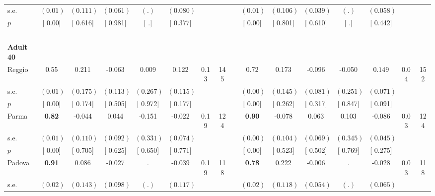 \begin{longtable}{L{8em} c c c c c c c p{1em} c c c c c c c}
\quad \quad \quad \quad s.e.& $ (     0.01)$ & $ (    0.111)$ & $ (    0.061)$ & $ (        .)$ & $ (    0.080)$ & & & & $ (     0.01)$ & $ (    0.106)$ & $ (    0.039)$ & $ (        .)$ & $ (    0.058)$ & &  \\*
\quad \quad \quad \quad $ p$ & [     0.00] & [    0.616] & [    0.981] & [        .] & [    0.377] & & & & [     0.00] & [    0.801] & [    0.610] & [        .] & [    0.442] & &  \\[1em]
~\\[1em]
\quad \quad \textbf{Adult 40} & & & & & & & & & & & & & & & \\* 
\quad \quad \quad Reggio& 0.55 &     0.211 &    -0.063 &     0.009 &     0.122 &      0.13 &       145 & & 0.72 &     0.173 &    -0.096 &    -0.050 & $ \mathbf{    0.149}$ &      0.04 &       152  \\*
\quad \quad \quad \quad s.e.& $ (     0.01)$ & $ (    0.175)$ & $ (    0.113)$ & $ (    0.267)$ & $ (    0.115)$ & & & & $ (     0.00)$ & $ (    0.145)$ & $ (    0.081)$ & $ (    0.251)$ & $ (    0.071)$ & &  \\*
\quad \quad \quad \quad $ p$ & [     0.00] & [    0.174] & [    0.505] & [    0.972] & [    0.177] & & & & [     0.00] & [    0.262] & [    0.317] & [    0.847] & [    0.091] & &  \\[1em]
\quad \quad \quad Parma& \textbf{     0.82} &    -0.044 &     0.044 &    -0.151 &    -0.022 &      0.19 &       124 & & \textbf{     0.90} &    -0.078 &     0.063 &     0.103 &    -0.086 &      0.03 &       124  \\*
\quad \quad \quad \quad s.e.& $ (     0.01)$ & $ (    0.110)$ & $ (    0.092)$ & $ (    0.331)$ & $ (    0.074)$ & & & & $ (     0.00)$ & $ (    0.104)$ & $ (    0.069)$ & $ (    0.345)$ & $ (    0.045)$ & &  \\*
\quad \quad \quad \quad $ p$ & [     0.00] & [    0.705] & [    0.625] & [    0.650] & [    0.771] & & & & [     0.00] & [    0.523] & [    0.502] & [    0.769] & [    0.275] & &  \\[1em]
\quad \quad \quad Padova& \textbf{     0.91} &     0.086 &    -0.027 &         . &    -0.039 &      0.19 &       118 & & \textbf{     0.78} &     0.222 &    -0.006 &         . &    -0.028 &      0.03 &       118  \\*
\quad \quad \quad \quad s.e.& $ (     0.02)$ & $ (    0.143)$ & $ (    0.098)$ & $ (        .)$ & $ (    0.117)$ & & & & $ (     0.02)$ & $ (    0.118)$ & $ (    0.054)$ & $ (        .)$ & $ (    0.065)$ & &  \\*

\end{longtable}
